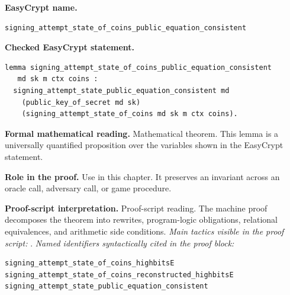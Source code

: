 \begin{formaltheorem}
\noindent\textbf{EasyCrypt name.}
\begin{lstlisting}[language=EasyCrypt,basicstyle=\ttfamily\scriptsize]
signing_attempt_state_of_coins_public_equation_consistent
\end{lstlisting}
\noindent\textbf{Checked EasyCrypt statement.}
\begin{lstlisting}[language=EasyCrypt,basicstyle=\ttfamily\scriptsize]
lemma signing_attempt_state_of_coins_public_equation_consistent
   md sk m ctx coins :
  signing_attempt_state_public_equation_consistent md
    (public_key_of_secret md sk)
    (signing_attempt_state_of_coins md sk m ctx coins).
\end{lstlisting}
\noindent\textbf{Formal mathematical reading.}
Mathematical theorem. This lemma is a universally quantified proposition over the variables shown in the EasyCrypt statement.

\noindent\textbf{Role in the proof.}
Use in this chapter. It preserves an invariant across an oracle call, adversary call, or game procedure.

\noindent\textbf{Proof-script interpretation.}
Proof-script reading. The machine proof decomposes the theorem into rewrites, program-logic obligations, relational equivalences, and arithmetic side conditions.
\emph{Main tactics visible in the proof script:} .
\emph{Named identifiers syntactically cited in the proof block:}
\begin{lstlisting}[language=EasyCrypt,basicstyle=\ttfamily\scriptsize]
signing_attempt_state_of_coins_highbitsE
signing_attempt_state_of_coins_reconstructed_highbitsE
signing_attempt_state_public_equation_consistent
\end{lstlisting}

\end{formaltheorem}


